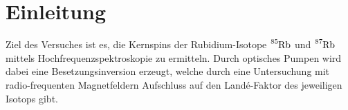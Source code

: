 \section{Einleitung}
\label{sec:einleitung}
Ziel des Versuches ist es, die Kernspins der Rubidium-Isotope
$\ce{^{85}Rb}$ und $\ce{^{87}Rb}$ mittels Hochfrequenzspektroskopie
zu ermitteln. Durch optisches Pumpen wird dabei eine Besetzungsinversion
erzeugt, welche durch eine Untersuchung mit radio-frequenten Magnetfeldern
Aufschluss auf den Landé-Faktor des jeweiligen Isotops gibt.
